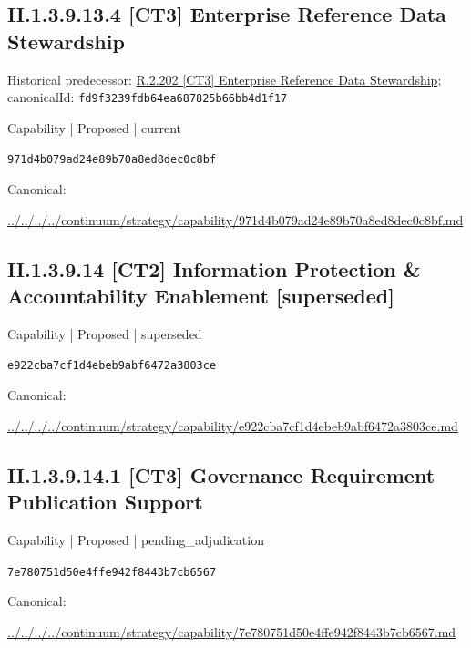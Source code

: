 \documentclass[10pt,a4paper]{article}
\begin{document}
\subsection*{II.1.3.9.13.4 [CT3] Enterprise Reference Data Stewardship}
Historical predecessor: \hyperref[element-fd9f3239fdb64ea687825b66bb4d1f17]{R.2.202 [CT3] Enterprise Reference Data Stewardship}; canonicalId: \texttt{fd9f3239fdb64ea687825b66bb4d1f17}\par
\label{element-971d4b079ad24e89b70a8ed8dec0c8bf}
{\small Capability | Proposed | current}\par
\texttt{971d4b079ad24e89b70a8ed8dec0c8bf}\par
Canonical: \par
{\footnotesize\url{../../../../continuum/strategy/capability/971d4b079ad24e89b70a8ed8dec0c8bf.md}}\par
\subsection*{II.1.3.9.14 [CT2] Information Protection \& Accountability Enablement [superseded]}
\label{element-e922cba7cf1d4ebeb9abf6472a3803ce}
{\small Capability | Proposed | superseded}\par
\texttt{e922cba7cf1d4ebeb9abf6472a3803ce}\par
Canonical: \par
{\footnotesize\url{../../../../continuum/strategy/capability/e922cba7cf1d4ebeb9abf6472a3803ce.md}}\par
\subsection*{II.1.3.9.14.1 [CT3] Governance Requirement Publication Support}
\label{element-7e780751d50e4ffe942f8443b7cb6567}
{\small Capability | Proposed | pending\_adjudication}\par
\texttt{7e780751d50e4ffe942f8443b7cb6567}\par
Canonical: \par
{\footnotesize\url{../../../../continuum/strategy/capability/7e780751d50e4ffe942f8443b7cb6567.md}}\par
\end{document}
